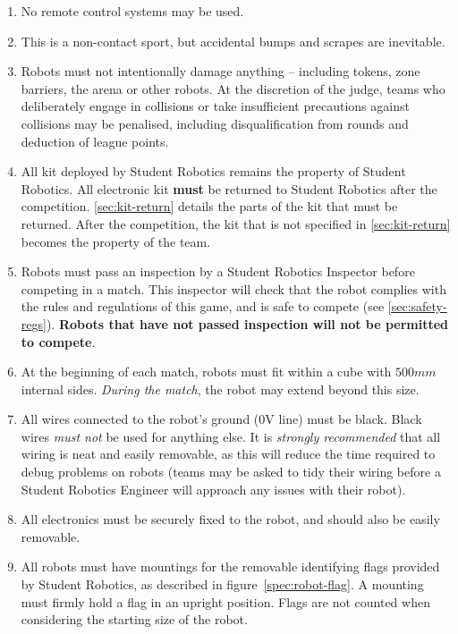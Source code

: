 \begin{enumerate}
\item No remote control systems may be used.
\item This is a non-contact sport, but accidental bumps and scrapes are inevitable.
\item Robots must not intentionally damage anything -- including tokens, zone barriers, the arena or other robots.
      At the discretion of the judge, teams who deliberately engage in collisions or take insufficient precautions against collisions may be penalised, including disqualification from rounds and deduction of league points.
\item All kit deployed by Student Robotics remains the property of Student Robotics.
      All electronic kit \textbf{must} be returned to Student Robotics after the competition.
      \autoref{sec:kit-return} details the parts of the kit that must be returned.
      After the competition, the kit that is not specified in \autoref{sec:kit-return} becomes the property of the team.


\item Robots must pass an inspection by a Student Robotics Inspector before competing in a match.
      This inspector will check that the robot complies with the rules and regulations of this game, and is safe to compete (see \autoref{sec:safety-regs}).
      \textbf{Robots that have not passed inspection will not be permitted to compete}.

\item At the beginning of each match, robots must fit within a cube with $500mm$ internal sides.
      \textit{During the match}, the robot may extend beyond this size.

\item All wires connected to the robot's ground (0V line) must be black.
      Black wires \emph{must not} be used for anything else.
      It is \emph{strongly recommended} that all wiring is neat and easily removable, as this will reduce the time required to debug problems on robots
       (teams may be asked to tidy their wiring before a Student Robotics Engineer will approach any issues with their robot).

\item All electronics must be securely fixed to the robot, and should also be easily removable.

\item All robots must have mountings for the removable identifying flags
      provided by Student Robotics, as described in figure~\ref{spec:robot-flag}. A mounting
      must firmly hold a flag in an upright position. Flags are not counted
      when considering the starting size of the robot.


\end{enumerate}
